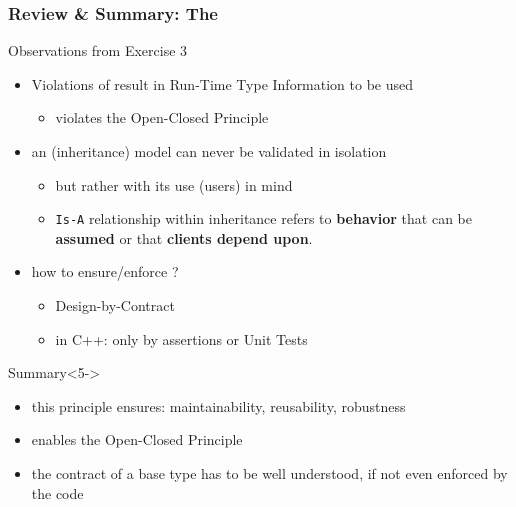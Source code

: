 \documentclass[9pt]{beamer}
\begin{document}
\begin{frame}
  \frametitle{Review \& Summary: The \secname}
  \begin{block}{Observations from Exercise 3}
    \begin{itemize}
    \item<2-> Violations of {\secname} result in Run-Time Type Information to be used
      \begin{itemize}
      \item violates the Open-Closed Principle
      \end{itemize}
    \item<3-> an (inheritance) model can never be validated in isolation 
      \begin{itemize}
      \item but rather with its use (users) in mind
      \item \texttt{Is-A} relationship within inheritance refers to \textbf{behavior} that can be \textbf{assumed} or that \textbf{clients depend upon}.
      \end{itemize}
    \item<4-> how to ensure/enforce \secname?
      \begin{itemize}
      \item Design-by-Contract 
      \item in C++: only by assertions or Unit Tests
      \end{itemize}
    \end{itemize}
  \end{block}
\pause
\vfill
\begin{block}{Summary}<5->
  \begin{itemize}
  \item this principle ensures: maintainability, reusability, robustness
  \item {\secname} enables the Open-Closed Principle
  \item the contract of a base type has to be well understood, if not even enforced by the code
  \end{itemize}
\end{block}
\end{frame}
\end{document}
